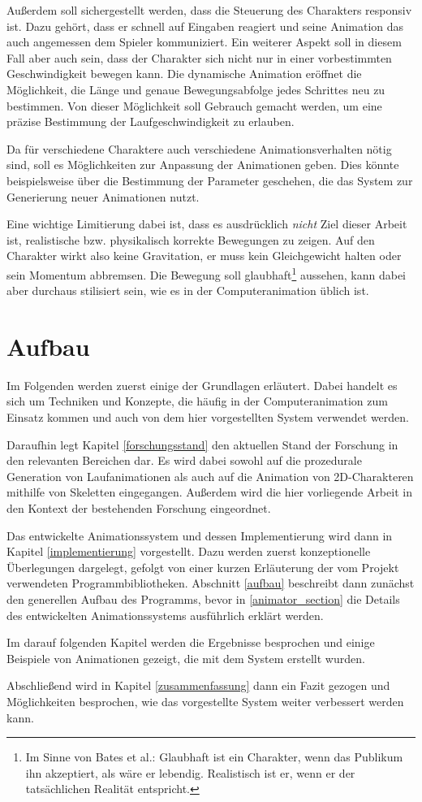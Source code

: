 Außerdem soll sichergestellt werden, dass die Steuerung des Charakters responsiv ist. Dazu gehört, dass er schnell auf Eingaben reagiert und seine Animation das auch angemessen dem Spieler kommuniziert. Ein weiterer Aspekt soll in diesem Fall aber auch sein, dass der Charakter sich nicht nur in einer vorbestimmten Geschwindigkeit bewegen kann. Die dynamische Animation eröffnet die Möglichkeit, die Länge und genaue Bewegungsabfolge jedes Schrittes neu zu bestimmen. Von dieser Möglichkeit soll Gebrauch gemacht werden, um eine präzise Bestimmung der Laufgeschwindigkeit zu erlauben.

Da für verschiedene Charaktere auch verschiedene Animationsverhalten nötig sind, soll es Möglichkeiten zur Anpassung der Animationen geben. Dies könnte beispielsweise über die Bestimmung der Parameter geschehen, die das System zur Generierung neuer Animationen nutzt.

Eine wichtige Limitierung dabei ist, dass es ausdrücklich \textit{nicht} Ziel dieser Arbeit ist, realistische bzw. physikalisch korrekte Bewegungen zu zeigen. Auf den Charakter wirkt also keine Gravitation, er muss kein Gleichgewicht halten oder sein Momentum abbremsen. Die Bewegung soll glaubhaft\footnote{Im Sinne von Bates et al.\cite{bates1994role}: Glaubhaft ist ein Charakter, wenn das Publikum ihn akzeptiert, als wäre er lebendig. Realistisch ist er, wenn er der tatsächlichen Realität entspricht.} aussehen, kann dabei aber durchaus stilisiert sein, wie es in der Computeranimation üblich ist.

\section{Aufbau}
Im Folgenden werden zuerst einige der Grundlagen erläutert. Dabei handelt es sich um Techniken und Konzepte, die häufig in der Computeranimation zum Einsatz kommen und auch von dem hier vorgestellten System verwendet werden.

Daraufhin legt Kapitel \ref{forschungsstand} den aktuellen Stand der Forschung in den relevanten Bereichen dar. Es wird dabei sowohl auf die prozedurale Generation von Laufanimationen als auch auf die Animation von 2D-Charakteren mithilfe von Skeletten eingegangen. Außerdem wird die hier vorliegende Arbeit in den Kontext der bestehenden Forschung eingeordnet.

Das entwickelte Animationssystem und dessen Implementierung wird dann in Kapitel \ref{implementierung} vorgestellt. Dazu werden zuerst konzeptionelle Überlegungen dargelegt, gefolgt von einer kurzen Erläuterung der vom Projekt verwendeten Programmbibliotheken. Abschnitt \ref{aufbau} beschreibt dann zunächst den generellen Aufbau des Programms, bevor in \ref{animator_section} die Details des entwickelten Animationssystems ausführlich erklärt werden.

Im darauf folgenden Kapitel werden die Ergebnisse besprochen und einige Beispiele von Animationen gezeigt, die mit dem System erstellt wurden.

Abschließend wird in Kapitel \ref{zusammenfassung} dann ein Fazit gezogen und Möglichkeiten besprochen, wie das vorgestellte System weiter verbessert werden kann.